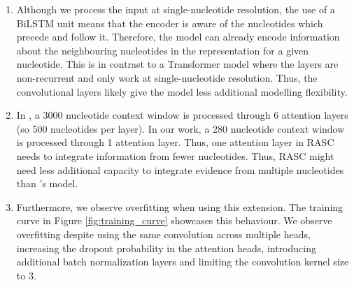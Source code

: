 \begin{enumerate}
	\item Although we process the input at single-nucleotide resolution, the use of a BiLSTM unit means that the encoder is aware of the nucleotides which precede and follow it. Therefore, the model can already encode information about the neighbouring nucleotides in the representation for a given nucleotide. This is in contrast to a Transformer model where the layers are non-recurrent and only work at single-nucleotide resolution. Thus, the convolutional layers likely give the model less additional modelling flexibility.
	\item In \cite{ghentransformers}, a 3000 nucleotide context window is processed through 6 attention layers (so 500 nucleotides per layer). In our work, a 280 nucleotide context window is processed through 1 attention layer. Thus, one attention layer in RASC needs to integrate information from fewer nucleotides. Thus, RASC might need less additional capacity to integrate evidence from multiple nucleotides than \cite{ghentransformers}'s model. 
	

	\item Furthermore, we observe overfitting when using this extension. The training curve in Figure \ref{fig:training_curve}
	showcases this behaviour. We observe overfitting despite using the same convolution across multiple heads, increasing the dropout probability in the attention heads, introducing additional batch normalization layers and limiting the convolution kernel size to 3.
\end{enumerate}


